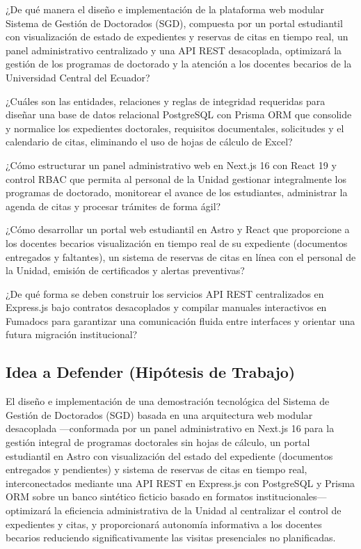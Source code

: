 \begin{description}[font=\bfseries\color{UceBlue}]
    \item[Pregunta Principal:] ¿De qué manera el diseño e implementación de la plataforma web modular Sistema de Gestión de Doctorados (SGD), compuesta por un portal estudiantil con visualización de estado de expedientes y reservas de citas en tiempo real, un panel administrativo centralizado y una API REST desacoplada, optimizará la gestión de los programas de doctorado y la atención a los docentes becarios de la Universidad Central del Ecuador?
    \item[Subpregunta 1:] ¿Cuáles son las entidades, relaciones y reglas de integridad requeridas para diseñar una base de datos relacional PostgreSQL con Prisma ORM que consolide y normalice los expedientes doctorales, requisitos documentales, solicitudes y el calendario de citas, eliminando el uso de hojas de cálculo de Excel?
    \item[Subpregunta 2:] ¿Cómo estructurar un panel administrativo web en Next.js 16 con React 19 y control RBAC que permita al personal de la Unidad gestionar integralmente los programas de doctorado, monitorear el avance de los estudiantes, administrar la agenda de citas y procesar trámites de forma ágil?
    \item[Subpregunta 3:] ¿Cómo desarrollar un portal web estudiantil en Astro y React que proporcione a los docentes becarios visualización en tiempo real de su expediente (documentos entregados y faltantes), un sistema de reservas de citas en línea con el personal de la Unidad, emisión de certificados y alertas preventivas?
    \item[Subpregunta 4:] ¿De qué forma se deben construir los servicios API REST centralizados en Express.js bajo contratos desacoplados y compilar manuales interactivos en Fumadocs para garantizar una comunicación fluida entre interfaces y orientar una futura migración institucional?
\end{description}

\subsection{Idea a Defender (Hipótesis de Trabajo)}

El diseño e implementación de una demostración tecnológica del Sistema de Gestión de Doctorados (SGD) basada en una arquitectura web modular desacoplada —conformada por un panel administrativo en Next.js 16 para la gestión integral de programas doctorales sin hojas de cálculo, un portal estudiantil en Astro con visualización del estado del expediente (documentos entregados y pendientes) y sistema de reservas de citas en tiempo real, interconectados mediante una API REST en Express.js con PostgreSQL y Prisma ORM sobre un banco sintético ficticio basado en formatos institucionales— optimizará la eficiencia administrativa de la Unidad al centralizar el control de expedientes y citas, y proporcionará autonomía informativa a los docentes becarios reduciendo significativamente las visitas presenciales no planificadas.
